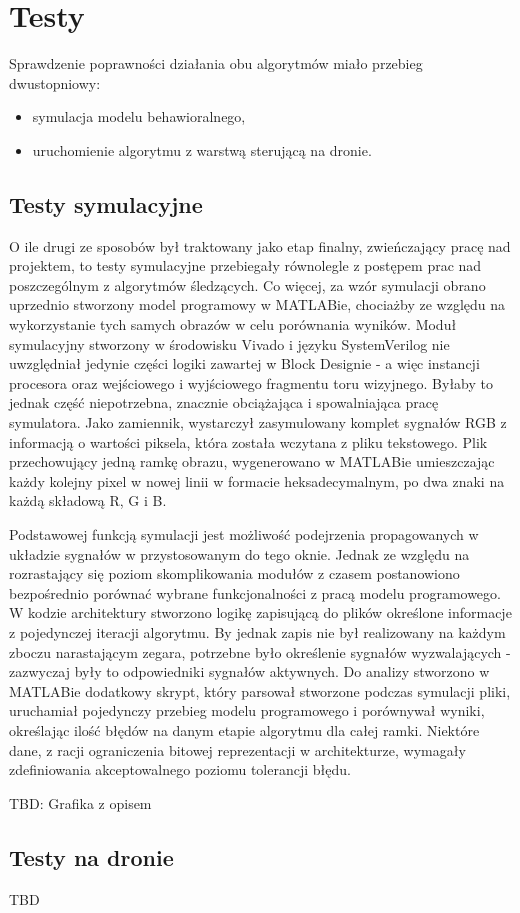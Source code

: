 \chapter{Testy}

Sprawdzenie poprawności działania obu algorytmów miało przebieg dwustopniowy:
\begin{itemize}
	\item symulacja modelu behawioralnego,
	\item uruchomienie algorytmu z warstwą sterującą na dronie.
\end{itemize}

\section{Testy symulacyjne}
O ile drugi ze sposobów był traktowany jako etap finalny, zwieńczający pracę nad projektem, to testy symulacyjne przebiegały równolegle z postępem prac nad poszczególnym z algorytmów śledzących. Co więcej, za wzór symulacji obrano uprzednio stworzony model programowy w MATLABie, chociażby ze względu na wykorzystanie tych samych obrazów w celu porównania wyników.
Moduł symulacyjny stworzony w środowisku Vivado i języku SystemVerilog nie uwzględniał jedynie części logiki zawartej w Block Designie - a więc instancji procesora oraz wejściowego i wyjściowego fragmentu toru wizyjnego. Byłaby to jednak część niepotrzebna, znacznie obciążająca i spowalniająca pracę symulatora. Jako zamiennik, wystarczył zasymulowany komplet sygnałów RGB z informacją o wartości piksela, która została wczytana z pliku tekstowego. Plik przechowujący jedną ramkę obrazu, wygenerowano w MATLABie umieszczając każdy kolejny pixel w nowej linii w formacie heksadecymalnym, po dwa znaki na każdą składową R, G i B.

Podstawowej funkcją symulacji jest możliwość podejrzenia propagowanych w układzie sygnałów w przystosowanym do tego oknie. Jednak ze względu na rozrastający się poziom skomplikowania modułów z czasem postanowiono bezpośrednio porównać wybrane funkcjonalności z pracą modelu programowego. W kodzie architektury stworzono logikę zapisującą do plików określone informacje z pojedynczej iteracji algorytmu. By jednak zapis nie był realizowany na każdym zboczu narastającym zegara, potrzebne było określenie sygnałów wyzwalających - zazwyczaj były to odpowiedniki sygnałów aktywnych. Do analizy stworzono w MATLABie dodatkowy skrypt, który parsował stworzone podczas symulacji pliki, uruchamiał pojedynczy przebieg modelu programowego i porównywał wyniki, określając ilość błędów na danym etapie algorytmu dla całej ramki. Niektóre dane, z racji ograniczenia bitowej reprezentacji w architekturze, wymagały zdefiniowania akceptowalnego poziomu tolerancji błędu.

TBD: Grafika z opisem

\section{Testy na dronie}

TBD